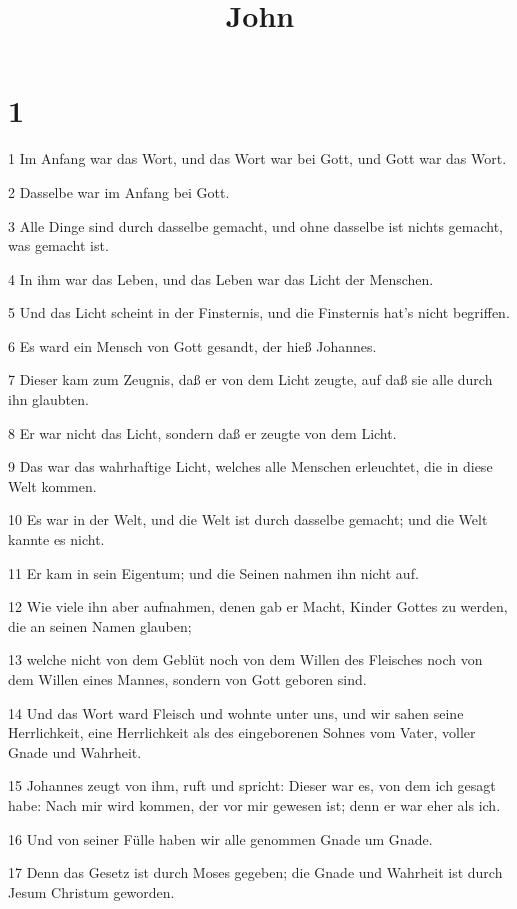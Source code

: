 

\title{John}


\chapter{1}

\par 1 Im Anfang war das Wort, und das Wort war bei Gott, und Gott war das Wort.
\par 2 Dasselbe war im Anfang bei Gott.
\par 3 Alle Dinge sind durch dasselbe gemacht, und ohne dasselbe ist nichts gemacht, was gemacht ist.
\par 4 In ihm war das Leben, und das Leben war das Licht der Menschen.
\par 5 Und das Licht scheint in der Finsternis, und die Finsternis hat's nicht begriffen.
\par 6 Es ward ein Mensch von Gott gesandt, der hieß Johannes.
\par 7 Dieser kam zum Zeugnis, daß er von dem Licht zeugte, auf daß sie alle durch ihn glaubten.
\par 8 Er war nicht das Licht, sondern daß er zeugte von dem Licht.
\par 9 Das war das wahrhaftige Licht, welches alle Menschen erleuchtet, die in diese Welt kommen.
\par 10 Es war in der Welt, und die Welt ist durch dasselbe gemacht; und die Welt kannte es nicht.
\par 11 Er kam in sein Eigentum; und die Seinen nahmen ihn nicht auf.
\par 12 Wie viele ihn aber aufnahmen, denen gab er Macht, Kinder Gottes zu werden, die an seinen Namen glauben;
\par 13 welche nicht von dem Geblüt noch von dem Willen des Fleisches noch von dem Willen eines Mannes, sondern von Gott geboren sind.
\par 14 Und das Wort ward Fleisch und wohnte unter uns, und wir sahen seine Herrlichkeit, eine Herrlichkeit als des eingeborenen Sohnes vom Vater, voller Gnade und Wahrheit.
\par 15 Johannes zeugt von ihm, ruft und spricht: Dieser war es, von dem ich gesagt habe: Nach mir wird kommen, der vor mir gewesen ist; denn er war eher als ich.
\par 16 Und von seiner Fülle haben wir alle genommen Gnade um Gnade.
\par 17 Denn das Gesetz ist durch Moses gegeben; die Gnade und Wahrheit ist durch Jesum Christum geworden.
